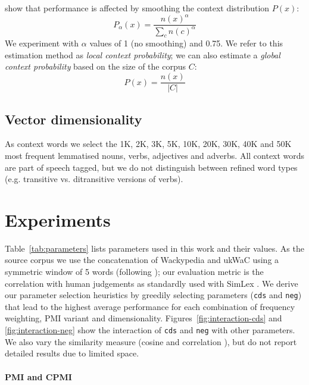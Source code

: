 \documentclass[11pt]{article}
\begin{document}
 show that performance is affected by smoothing the context distribution $P(x)$:
%
\begin{equation}
  \label{eq:cds}
  P_{\alpha}(x) = \frac{n(x)^{\alpha}}{\sum_{c}n(c)^{\alpha}}
\end{equation}
%
We experiment with $\alpha$ values of 1 (no smoothing) and 0.75. We refer to this estimation method as \emph{local context probability}; we can also estimate a \emph{global context probability} based on the size of the corpus $C$:
%
\begin{equation}
  \label{eq:cds-nan}
  P(x) = \frac{n(x)}{|C|}
\end{equation}
%

\subsection{Vector dimensionality}
\label{sec:vect-dimens}

As context words we select the 1K, 2K, 3K, 5K, 10K, 20K, 30K, 40K and 50K most frequent lemmatised nouns, verbs, adjectives and adverbs. All context words are part of speech tagged, but we do not distinguish between refined word types (e.g. transitive vs. ditransitive versions of verbs).

\section{Experiments}
\label{sec:lexical-experiments}

Table~\ref{tab:parameters} lists parameters used in this work and their values. As the source corpus we use the concatenation of Wackypedia and ukWaC \cite{Baroni2009} using a symmetric window of 5 words (following ); our evaluation metric is the correlation with human judgements as standardly used with SimLex \cite{hill2014simlex}. We derive our parameter selection heuristics by greedily selecting parameters (\texttt{cds} and \texttt{neg}) that lead to the highest average performance for each combination of frequency weighting, PMI variant and dimensionality. Figures~\ref{fig:interaction-cds} and \ref{fig:interaction-neg} show the interaction of \texttt{cds} and \texttt{neg} with other parameters. We also vary the similarity measure (cosine and correlation  \cite{kiela-clark:2014:CVSC}), but do not report detailed results due to limited space.

\paragraph{PMI and CPMI}
\end{document}
